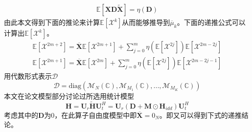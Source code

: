 \documentclass[bachelor,nocolorlinks, printoneside]{seuthesis} %
\begin{document}
\begin{Main}
\begin{eqnarray}
\mathbb{E}[\mathbf{X}\mathbf{D}\tilde{\mathbf{X}}] = \eta(\mathbf{D})
\end{eqnarray}
由此本文得到下面的推论来计算$\mathbb{E}[\mathcal{X}^k]$从而能够推导到$\overline{\mu}_k$。下面的递推公式可以计算出$\mathbb{E}[\mathcal{X}^k]$。
\begin{eqnarray}\label{key}
\mathbb{E}[\mathcal{X}^{2m+2}]=\overline{\mathbf{X}}\mathbb{E}[\mathcal{X}^{2m+1}]+\sum_{j=0}^{m}\eta(\mathbb{E}[\mathcal{X}^{2j}])\mathbb{E}[\mathcal{X}^{2m-2j}]  \\
\mathbb{E}[\mathcal{X}^{2m+1}]=\overline{\mathbf{X}}\mathbb{E}[\mathcal{X}^{2m}]+\sum_{j=0}^{m}\eta(\mathbb{E}[\mathcal{X}^{2j}])\mathbb{E}[\mathcal{X}^{2m-2j-1}] 
\end{eqnarray}
用代数形式表示$\mathcal{D}$
\begin{equation}\label{key}
\mathcal{D} = \mathrm{diag}(\mathcal{M}_N(\mathbb{C}),\mathcal{M}_{M_1}(\mathbb{C}),...,\mathcal{M}_{M_K}(\mathbb{C}))
\end{equation}
本文在论文模型部分讨论过所选用统计模型
\begin{equation}\label{key}
\mathbf{H} = \mathbf{U}_{r}\tilde{\mathbf{H}}\mathbf{U}_{t}^{H} = \mathbf{U}_{r}(\mathbf{D}+\mathbf{M}\odot \mathbf{H}_{idd})\mathbf{U}_{t}^{H}
\end{equation}
考虑其中的$\mathbf{D}$为0，在此算子自由度模型中即$\overline{\mathbf{X}} = 0_N$。即又可以得到下式的递推结论。










\end{Main} %



%



\newpage
\printindex %



%
%
\end{document}
